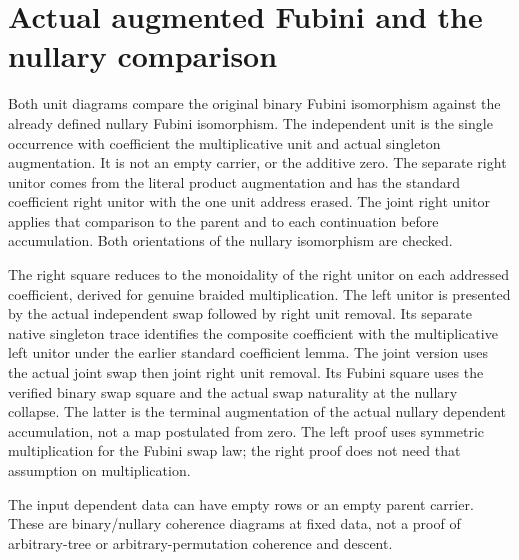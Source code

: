 \documentclass{article}
\begin{document}
\section*{Actual augmented Fubini and the nullary comparison}
Both unit diagrams compare the original binary Fubini isomorphism
against the already defined nullary Fubini isomorphism. The
independent unit is the single occurrence with coefficient the
multiplicative unit and actual singleton augmentation. It is
not an empty carrier, or the additive zero. The separate right
unitor comes from the literal product augmentation and has the
standard coefficient right unitor with the one unit address
erased. The joint right unitor applies that comparison to the
parent and to each continuation before accumulation. Both
orientations of the nullary isomorphism are checked.

The right square reduces to the monoidality of the right unitor
on each addressed coefficient, derived for genuine braided
multiplication. The left unitor is presented by the actual
independent swap followed by right unit removal. Its separate
native singleton trace identifies the composite coefficient
with the multiplicative left unitor under the earlier standard
coefficient lemma. The joint version uses the actual joint swap
then joint right unit removal. Its Fubini square uses the verified
binary swap square and the actual swap naturality at the nullary
collapse. The latter is the terminal augmentation of the actual
nullary dependent accumulation, not a map postulated from zero.
The left proof uses symmetric multiplication for the Fubini swap
law; the right proof does not need that assumption on multiplication.

The input dependent data can have empty rows or an empty parent
carrier. These are binary/nullary coherence diagrams at fixed
data, not a proof of arbitrary-tree or arbitrary-permutation
coherence and descent.
\end{document}
